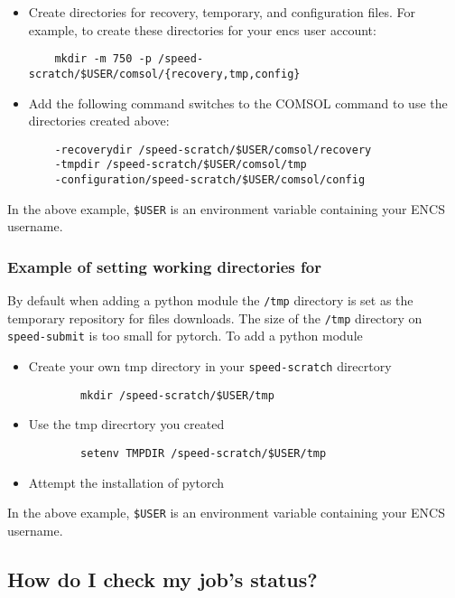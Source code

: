 \documentclass{easychair}
\begin{document}
\begin{itemize}
	\item 
	Create directories for recovery, temporary, and configuration files. 
	For example, to create these directories for your encs user account:
	\begin{verbatim}
	mkdir -m 750 -p /speed-scratch/$USER/comsol/{recovery,tmp,config}
	\end{verbatim}
	\item
	Add the following command switches to the COMSOL command to use the 
	directories created above:
	\begin{verbatim} 
	-recoverydir /speed-scratch/$USER/comsol/recovery 
	-tmpdir /speed-scratch/$USER/comsol/tmp
	-configuration/speed-scratch/$USER/comsol/config
	\end{verbatim}
\end{itemize} 
In the above example, \verb!$USER! is an environment variable containing your ENCS username.

\subsubsection{Example of setting working directories for }

By default when adding a python module the \texttt{/tmp} directory is set as the temporary repository for files downloads. 
The size of the \texttt{/tmp} directory on \verb!speed-submit! is too small for pytorch.
To add a python module
\begin{itemize}
    \item 	
	Create your own tmp directory in your \verb!speed-scratch! direcrtory
	\begin{verbatim} 
        mkdir /speed-scratch/$USER/tmp
	\end{verbatim}
	\item
    Use the tmp direcrtory you created
	\begin{verbatim} 
        setenv TMPDIR /speed-scratch/$USER/tmp
	\end{verbatim}
    \item
	Attempt the installation of pytorch
\end{itemize}

In the above example, \verb!$USER! is an environment variable containing your ENCS username.

\subsection{How do I check my job's status?}
\end{document}
